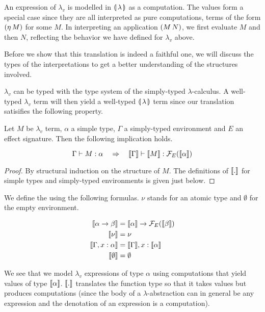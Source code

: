 An expression of $\lambda_v$ is modelled in $\llparenthesis \, \lambda \, \rrparenthesis$ as a
computation. The values form a special case since they are all interpreted
as pure computations, terms of the form $(\eta\,M)$ for some $M$. In
interpreting an application $(M\,N)$, we first evaluate $M$ and then
$N$, reflecting the behavior we have defined for $\lambda_v$ above.

Before we show that this translation is indeed a faithful one, we will
discuss the types of the interpretations to get a better understanding of
the structures involved.

$\lambda_v$ can be typed with the type system of the simply-typed
$\lambda$-calculus. A well-typed $\lambda_v$ term will then yield a
well-typed $\llparenthesis \, \lambda \, \rrparenthesis$ term since our translation satisifies the
following property. 

\begin{property}
  Let $M$ be $\lambda_v$ term, $\alpha$ a simple type, $\Gamma$ a
  simply-typed environment and $E$ an effect signature. Then the following
  implication holds.

$$
\Gamma \vdash M : \alpha
\quad \Rightarrow \quad
\llbracket \Gamma \rrbracket \vdash \llbracket M \rrbracket : \mathcal{F}_E(\llbracket \alpha \rrbracket)
$$
\end{property}

\begin{proof}
  By structural induction on the structure of $M$. The definitions of
  $\llbracket . \rrbracket$ for simple types and simply-typed environments is given just
  below.
\end{proof}

\begin{definition}
We define the  using the
following formulas. $\nu$ stands for an atomic type and $\emptyset$ for the
empty environment.

\begin{align*}
  \llbracket \alpha \to \beta \rrbracket &= \llbracket \alpha \rrbracket \to \mathcal{F}_E(\llbracket \beta \rrbracket) \\
  \llbracket \nu \rrbracket &= \nu \\
  \llbracket \Gamma, x: \alpha \rrbracket &= \llbracket \Gamma \rrbracket, x: \llbracket \alpha \rrbracket \\
  \llbracket \emptyset \rrbracket &= \emptyset
\end{align*}
\end{definition}

We see that we model $\lambda_v$ expressions of type $\alpha$ using
computations that yield values of type $\llbracket \alpha \rrbracket$. $\llbracket . \rrbracket$ translates
the function type so that it takes values but produces computations (since
the body of a $\lambda$-abstraction can in general be any expression and
the denotation of an expression is a computation).

